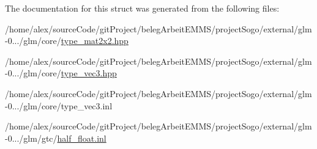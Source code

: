 The documentation for this struct was generated from the following files\-:\begin{DoxyCompactItemize}
\item 
/home/alex/source\-Code/git\-Project/beleg\-Arbeit\-E\-M\-M\-S/project\-Sogo/external/glm-\/0.../glm/core/\hyperlink{type__mat2x2_8hpp}{type\-\_\-mat2x2.\-hpp}\item 
/home/alex/source\-Code/git\-Project/beleg\-Arbeit\-E\-M\-M\-S/project\-Sogo/external/glm-\/0.../glm/core/\hyperlink{type__vec3_8hpp}{type\-\_\-vec3.\-hpp}\item 
/home/alex/source\-Code/git\-Project/beleg\-Arbeit\-E\-M\-M\-S/project\-Sogo/external/glm-\/0.../glm/core/type\-\_\-vec3.\-inl\item 
/home/alex/source\-Code/git\-Project/beleg\-Arbeit\-E\-M\-M\-S/project\-Sogo/external/glm-\/0.../glm/gtc/\hyperlink{half__float_8inl}{half\-\_\-float.\-inl}\end{DoxyCompactItemize}
